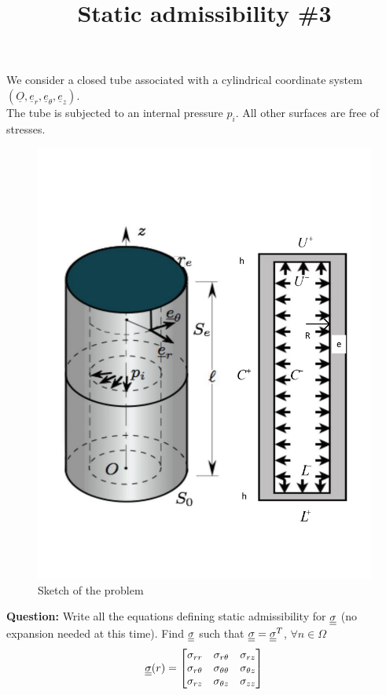 \documentclass[letter,12pt]{article}
\begin{document}
\pagestyle{fancy}

\title{\textbf{Static admissibility \#3}}
\date{}

\maketitle

\vspace{-1cm}


We consider a closed tube associated with a cylindrical coordinate system $(\underline{O}, \underline{e}_r, \underline{e}_{\theta}, \underline{e}_z)$. \\

The tube is subjected to an internal pressure $p_i$. All other surfaces are free of stresses.\\

%
\begin{figure}[!h]
	\centering
	\includegraphics[width=0.6\linewidth]{./volume}
	\caption{Sketch of the problem}
\end{figure}

\noindent \textbf{Question:} Write all the equations defining static admissibility  for $\underline{\underline{\sigma}}$ (no expansion needed at this time). Find $\underline{\underline{\sigma}} $ such that $\underline{\underline{\sigma}} = \underline{\underline{\sigma}}^T $,  $\forall n \in \Omega$ \\

\begin{equation}
\underline{\underline{\sigma}}(r) = \left[
\begin{matrix}
\sigma_{rr} & \sigma_{r\theta} & \sigma_{rz} \\
\sigma_{r\theta} & \sigma_{\theta\theta} & \sigma_{\theta z} \\
\sigma_{rz} & \sigma_{\theta z} & \sigma_{zz} 
\end{matrix}
\right]
\end{equation} \\
\end{document}

